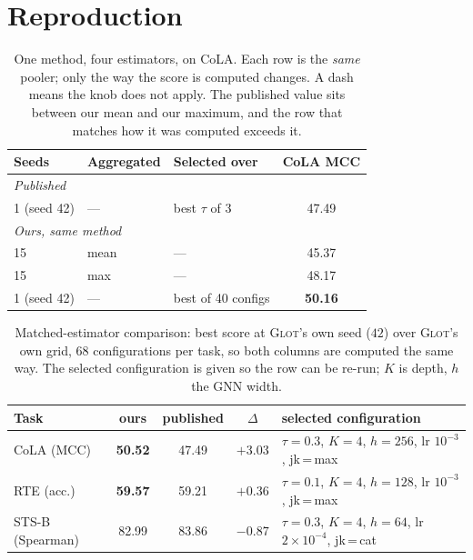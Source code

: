 \documentclass{article}
\begin{document}
\section{Reproduction}
\label{app:repro}

\begin{table}[h]
\caption{One method, four estimators, on CoLA. Each row is the \emph{same}
pooler; only the way the score is computed changes. A dash means the knob does
not apply. The published value sits between our mean and our maximum, and the
row that matches how it was computed exceeds it.}
\label{tab:estimator}
\begin{center}
\small
\begin{tabular}{lllc}
\toprule
Seeds & Aggregated & Selected over & CoLA MCC \\
\midrule
\multicolumn{4}{l}{\emph{Published \citep{mantri2026glot}}} \\
1 (seed 42) & --- & best $\tau$ of 3 & 47.49 \\
\midrule
\multicolumn{4}{l}{\emph{Ours, same method}} \\
15 & mean & --- & 45.37 \\
15 & max  & --- & 48.17 \\
1 (seed 42) & --- & best of 40 configs & \textbf{50.16} \\
\bottomrule
\end{tabular}
\end{center}
\end{table}

\begin{table}[h]
\caption{Matched-estimator comparison: best score at \textsc{Glot}'s own seed
($42$) over \textsc{Glot}'s own grid, $68$ configurations per task, so both
columns are computed the same way. The selected configuration is given so the
row can be re-run; $K$ is depth, $h$ the GNN width.}
\label{tab:repro}
\begin{center}
\small
\begin{tabular}{lcccl}
\toprule
Task & ours & published & $\Delta$ & selected configuration \\
\midrule
CoLA (MCC)       & \textbf{50.52} & 47.49 & $+3.03$ & $\tau{=}0.3$, $K{=}4$, $h{=}256$, lr $10^{-3}$, jk\,=\,max \\
RTE (acc.)       & \textbf{59.57} & 59.21 & $+0.36$ & $\tau{=}0.1$, $K{=}4$, $h{=}128$, lr $10^{-3}$, jk\,=\,max \\
STS-B (Spearman) & 82.99 & 83.86 & $-0.87$ & $\tau{=}0.3$, $K{=}4$, $h{=}64$, lr $2{\times}10^{-4}$, jk\,=\,cat \\
\bottomrule
\end{tabular}
\end{center}
\end{table}
\end{document}
